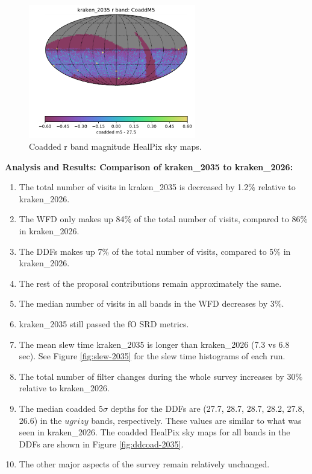 \documentclass[DM,authoryear,toc]{lsstdoc}
\begin{document}
\begin{figure}[ht]
\centering
\includegraphics[width=0.65\textwidth]{figures/kraken_2035_CoaddM5_r_band_HEAL_SkyMap.pdf}
\caption{Coadded r band magnitude HealPix sky maps.}
\label{fig:rbandmap-2035}
\end{figure}

\textbf{Analysis and Results: Comparison of kraken\_2035 to kraken\_2026:}

\begin{enumerate}
\item The total number of visits in kraken\_2035 is decreased by 1.2$\%$ relative to kraken\_2026.
\item The WFD only makes up 84$\%$ of the total number of visits, compared to 86$\%$ in kraken\_2026.
\item The DDFs makes up 7$\%$ of the total number of visits, compared to 5$\%$ in kraken\_2026.
\item The rest of the proposal contributions remain approximately the same.
\item The median number of visits in all bands in the WFD decreases by 3$\%$.
\item kraken\_2035 still passed the fO SRD metrics.
\item The mean slew time kraken\_2035 is longer than kraken\_2026 (7.3 vs 6.8 sec).
See Figure \autoref{fig:slew-2035} for the slew time histograms of each run.
\item The total number of filter changes during the whole survey increases by 30$\%$ relative to kraken\_2026.
\item The median coadded $5\sigma$ depths for the DDFs are (27.7, 28.7, 28.7, 28.2, 27.8, 26.6) in the $ugrizy$ bands, respectively.
These values are similar to what was seen in kraken\_2026. The coadded HealPix sky maps for all bands in the DDFs are shown in
 Figure \autoref{fig:ddcoad-2035}.
\item The other major aspects of the survey remain relatively unchanged.

\end{enumerate}
\end{document}
